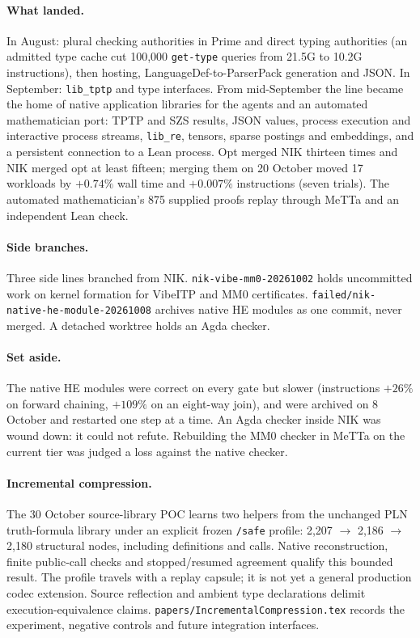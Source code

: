 \documentclass[11pt]{article}
\newcommand{\code}[1]{\texttt{#1}}
\newcommand{\HE}{\textup{HE}}
\begin{document}
\paragraph{What landed.}  In August: plural checking authorities in Prime and
direct typing authorities (an admitted type cache cut 100{,}000
\code{get-type} queries from 21.5G to 10.2G instructions), then hosting,
LanguageDef-to-ParserPack generation and JSON.  In September:
\code{lib\_tptp} and type interfaces.  From mid-September the line became the
home of native application libraries for the agents and an automated
mathematician port: TPTP and SZS results, JSON values, process execution and
interactive process streams, \code{lib\_re}, tensors, sparse postings and
embeddings, and a persistent connection to a Lean process.  Opt merged NIK
thirteen times and NIK merged opt at least fifteen; merging them on
20 October moved 17 workloads by $+0.74\%$ wall time and $+0.007\%$
instructions (seven trials).  The automated mathematician's 875 supplied
proofs replay through MeTTa and an independent Lean check.

\paragraph{Side branches.}  Three side lines branched from NIK.
\code{nik-vibe-mm0-20261002} holds uncommitted work on kernel formation for
VibeITP and MM0 certificates.  \code{failed/nik-native-he-module-20261008}
archives native \HE{} modules as one commit, never merged.  A detached
worktree holds an Agda checker.

\paragraph{Set aside.}  The native \HE{} modules were correct on every gate but
slower (instructions $+26\%$ on forward chaining, $+109\%$ on an eight-way
join), and were archived on 8 October and restarted one step at a time.  An
Agda checker inside NIK was wound down: it could not refute.  Rebuilding the
MM0 checker in MeTTa on the current tier was judged a loss against the native
checker.

\paragraph{Incremental compression.} The 30 October source-library POC learns
two helpers from the unchanged PLN truth-formula library under an explicit
frozen \code{/safe} profile: 2,207 $\to$ 2,186 $\to$ 2,180 structural nodes,
including definitions and calls. Native reconstruction, finite public-call
checks and stopped/resumed agreement qualify this bounded result. The profile
travels with a replay capsule; it is not yet a general production codec extension.
Source reflection and ambient type declarations delimit execution-equivalence
claims. \texttt{papers/IncrementalCompression.tex} records the experiment,
negative controls and future integration interfaces.
\end{document}
